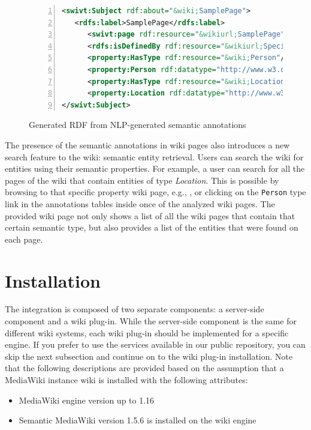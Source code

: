 \begin{figure}[h!]
\centering
\begin{lstlisting}[language=XML,numbers=left,xleftmargin=4mm,columns=flexible]
<swivt:Subject rdf:about="&wiki;SamplePage">
   <rdfs:label>SamplePage</rdfs:label>
      <swivt:page rdf:resource="&wikiurl;SamplePage"/>
      <rdfs:isDefinedBy rdf:resource="&wikiurl;Special:ExportRDF/SamplePage"/>
      <property:HasType rdf:resource="&wiki;Person"/>
      <property:Person rdf:datatype="http://www.w3.org/2001/XMLSchema#string">Mary</property:Person>
      <property:HasType rdf:resource="&wiki;Location"/>
      <property:Location rdf:datatype="http://www.w3.org/2001/XMLSchema#string">Canada</property:Location>
</swivt:Subject>
\end{lstlisting}
\caption{Generated RDF from NLP-generated semantic annotations}
\label{list:smw_rdf}
\end{figure}

The presence of the semantic annotations in wiki pages also introduces a new search feature to the wiki: semantic entity retrieval. Users can search the wiki for entities using their semantic properties. For example, a user can search for all the pages of the wiki that contain entities of type \emph{Location}. This is possible by browsing to that specific property wiki page, e.g., , or clicking on the \texttt{Person} type link in the annotations tables inside once of the analyzed wiki pages. The provided wiki page not only shows a list of all the wiki pages that contain that certain semantic type, but also provides a list of the entities that were found on each page.

\section{Installation}
The \wikinlp integration is composed of two separate components: a server-side component and a wiki plug-in. While the server-side component is the same for different wiki systems, each wiki plug-in should be implemented for a specific engine. If you prefer to use the services available in our public repository, you can skip the next subsection and continue on to the wiki plug-in installation. Note that the following descriptions are provided based on the assumption that a MediaWiki instance wiki is installed with the following attributes:

\begin{itemize}
\item MediaWiki engine version up to 1.16
\item Semantic MediaWiki version 1.5.6 is installed on the wiki engine
\end{itemize}


